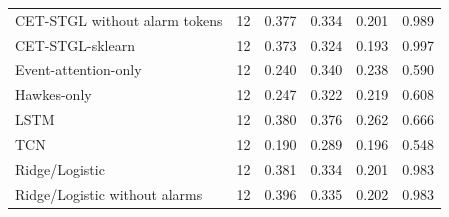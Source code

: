 \begin{table}[t]
\begin{tabular}{llrrrr}
CET-STGL without alarm tokens & 12 & 0.377 & 0.334 & 0.201 & 0.989 \\
CET-STGL-sklearn & 12 & 0.373 & 0.324 & 0.193 & 0.997 \\
Event-attention-only & 12 & 0.240 & 0.340 & 0.238 & 0.590 \\
Hawkes-only & 12 & 0.247 & 0.322 & 0.219 & 0.608 \\
LSTM & 12 & 0.380 & 0.376 & 0.262 & 0.666 \\
TCN & 12 & 0.190 & 0.289 & 0.196 & 0.548 \\
Ridge/Logistic & 12 & 0.381 & 0.334 & 0.201 & 0.983 \\
Ridge/Logistic without alarms & 12 & 0.396 & 0.335 & 0.202 & 0.983 \\
\bottomrule
\end{tabular}

\end{table}
